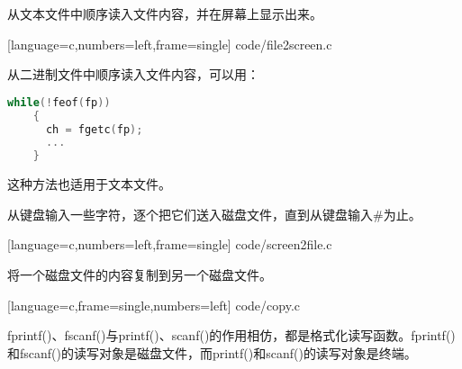 \begin{frame}[fragile]
  \begin{li}
    从文本文件中顺序读入文件内容，并在屏幕上显示出来。
  \end{li}
\end{frame}

\begin{frame}
  
  [language=c,numbers=left,frame=single]
  {code/file2screen.c}

\end{frame}

\begin{frame}[fragile]
  从二进制文件中顺序读入文件内容，可以用：
  \begin{lstlisting}[language=c,backgroundcolor=\color{red!20}]
    while(!feof(fp))
    {
      ch = fgetc(fp);
      ...
    }  
  \end{lstlisting}
  \textcolor{acolor1}{这种方法也适用于文本文件。}
\end{frame}

\begin{frame}[fragile]
  \begin{li}
    从键盘输入一些字符，逐个把它们送入磁盘文件，直到从键盘输入\#为止。    
  \end{li}
\end{frame}

\begin{frame}
  
  [language=c,numbers=left,frame=single]
  {code/screen2file.c}
\end{frame}


\begin{frame}[fragile]
  \begin{li}
    将一个磁盘文件的内容复制到另一个磁盘文件。
  \end{li}
\end{frame}

\begin{frame}
  
  [language=c,frame=single,numbers=left]
  {code/copy.c}
\end{frame}




\begin{frame}[fragile]
  {\tf fprintf()}、{\tf fscanf()}与{\tf printf()、scanf()}的作用相仿，都是格式化读写函数。{\tf fprintf()}和{\tf fscanf()}的读写对象是磁盘文件，而{\tf printf()}和{\tf scanf()}的读写对象是终端。
\end{frame}

